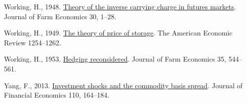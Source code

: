 \documentclass[]{elsarticle} %
\newlength{\cslhangindent}
\newlength{\cslentryspacingunit} %
\newenvironment{CSLReferences}[2] %
 {%
  \setlength{\parindent}{0pt}
  \ifodd #1
  \let\oldpar\par
  \def\par{\hangindent=\cslhangindent\oldpar}
  \fi
  \setlength{\parskip}{#2\cslentryspacingunit}
 }%
 {}
\begin{document}
\begin{CSLReferences}{1}{0}
\leavevmode{}%
Working, H., 1948. \href{https://doi.org/10.2307/1232678}{Theory of the inverse carrying charge in futures markets}. Journal of Farm Economics 30, 1--28.

\leavevmode{}%
Working, H., 1949. \href{https://www.jstor.org/stable/1816601}{The theory of price of storage}. The American Economic Review 1254--1262.

\leavevmode{}%
Working, H., 1953. \href{https://doi.org/10.2307/1233368}{Hedging reconsidered}. Journal of Farm Economics 35, 544--561.

\leavevmode{}%
Yang, F., 2013. \href{https://doi.org/10.1016/j.jfineco.2013.04.012}{Investment shocks and the commodity basis spread}. Journal of Financial Economics 110, 164--184.

\end{CSLReferences}
\end{document}
